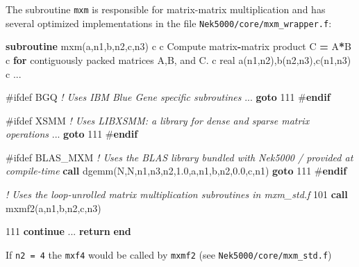 \documentclass[
]{scrartcl}
\newenvironment{Shaded}{}{}
\newcommand{\CommentTok}[1]{\textcolor[rgb]{0.38,0.63,0.69}{\textit{#1}}}
\newcommand{\DataTypeTok}[1]{\textcolor[rgb]{0.56,0.13,0.00}{#1}}
\newcommand{\DecValTok}[1]{\textcolor[rgb]{0.25,0.63,0.44}{#1}}
\newcommand{\FloatTok}[1]{\textcolor[rgb]{0.25,0.63,0.44}{#1}}
\newcommand{\FunctionTok}[1]{\textcolor[rgb]{0.02,0.16,0.49}{#1}}
\newcommand{\KeywordTok}[1]{\textcolor[rgb]{0.00,0.44,0.13}{\textbf{#1}}}
\newcommand{\NormalTok}[1]{#1}
\newcommand{\StringTok}[1]{\textcolor[rgb]{0.25,0.44,0.63}{#1}}
\begin{document}
The subroutine \texttt{mxm} is responsible for matrix-matrix
multiplication and has several optimized implementations in the file
\texttt{Nek5000/core/mxm\_wrapper.f}:

\begin{Shaded}
\begin{Highlighting}[]
       \KeywordTok{subroutine}\NormalTok{ mxm(a,n1,b,n2,c,n3)}
\NormalTok{ c}
\NormalTok{ c     Compute matrix}\KeywordTok{{-}}\NormalTok{matrix }\FunctionTok{product}\NormalTok{ C }\KeywordTok{=}\NormalTok{ A}\KeywordTok{*}\NormalTok{B}
\NormalTok{ c     }\KeywordTok{for}\NormalTok{ contiguously packed matrices A,B, and C.}
\NormalTok{ c}
       \DataTypeTok{real}\NormalTok{ a(n1,n2),b(n2,n3),c(n1,n3)}
\NormalTok{ c}
\NormalTok{       ...}
 
\NormalTok{ \#ifdef BGQ}
       \CommentTok{! Uses IBM Blue Gene specific subroutines}
\NormalTok{       ...}
       \KeywordTok{goto} \DecValTok{111}
\NormalTok{ \#}\KeywordTok{endif}
 
\NormalTok{ \#ifdef XSMM}
       \CommentTok{! Uses LIBXSMM: a library for dense and sparse matrix operations}
\NormalTok{       ...}
       \KeywordTok{goto} \DecValTok{111}
\NormalTok{ \#}\KeywordTok{endif}
 
\NormalTok{ \#ifdef BLAS\_MXM}
       \CommentTok{! Uses the BLAS library bundled with Nek5000 / provided at compile{-}time}
       \KeywordTok{call}\NormalTok{ dgemm(}\StringTok{\textquotesingle{}N\textquotesingle{}}\NormalTok{,}\StringTok{\textquotesingle{}N\textquotesingle{}}\NormalTok{,n1,n3,n2,}\FloatTok{1.0}\NormalTok{,a,n1,b,n2,}\FloatTok{0.0}\NormalTok{,c,n1)}
       \KeywordTok{goto} \DecValTok{111}
\NormalTok{ \#}\KeywordTok{endif}
 
       \CommentTok{! Uses the loop{-}unrolled matrix multiplication subroutines in mxm\_std.f}
  \DecValTok{101}  \KeywordTok{call}\NormalTok{ mxmf2(a,n1,b,n2,c,n3)}
 
  \DecValTok{111}  \KeywordTok{continue}
\NormalTok{       ...}
       \KeywordTok{return}
       \KeywordTok{end}
\end{Highlighting}
\end{Shaded}

If \texttt{n2\ =\ 4} the \texttt{mxf4} would be called by \texttt{mxmf2}
(see \texttt{Nek5000/core/mxm\_std.f})
\end{document}
